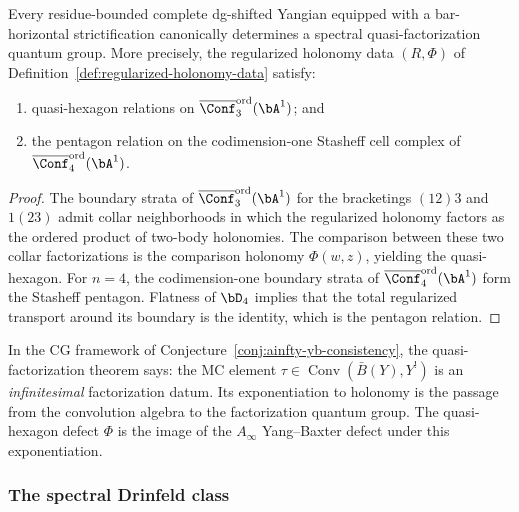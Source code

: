 \begin{theorem}
\label{thm:spectral-quasi-factorization}
Every residue-bounded complete dg-shifted Yangian equipped
with a bar-horizontal strictification canonically determines a
spectral quasi-factorization quantum group. More precisely,
the regularized holonomy data $(R,\Phi)$ of
Definition~\textup{\ref{def:regularized-holonomy-data}} satisfy:
\begin{enumerate}[label=\textup{(\roman*)}]
\item quasi-hexagon relations on
 $\overline{\Conf}_3^{\mathrm{ord}}(\bA^1)$; and
\item the pentagon relation on the codimension-one Stasheff
 cell complex of $\overline{\Conf}_4^{\mathrm{ord}}(\bA^1)$.
\end{enumerate}
\end{theorem}

\begin{proof}
The boundary strata of
$\overline{\Conf}_3^{\mathrm{ord}}(\bA^1)$ for the
bracketings $(12)3$ and $1(23)$ admit collar neighborhoods
in which the regularized holonomy factors as the ordered
product of two-body holonomies. The comparison between
these two collar factorizations is the comparison holonomy
$\Phi(w,z)$, yielding the quasi-hexagon.
For $n = 4$, the codimension-one boundary strata of
$\overline{\Conf}_4^{\mathrm{ord}}(\bA^1)$ form the
Stasheff pentagon. Flatness of $\bD_4$ implies that the
total regularized transport around its boundary is the
identity, which is the pentagon relation.
\end{proof}

\begin{remark}[CG interpretation]
\label{rem:spectral-bridge-cg}
In the CG framework of
Conjecture~\ref{conj:ainfty-yb-consistency}, the
quasi-factorization theorem says: the MC element
$\tau \in \operatorname{Conv}(\bar B(Y), Y^!)$ is an
\emph{infinitesimal} factorization datum. Its
exponentiation to holonomy is the passage from the
convolution algebra to the factorization quantum group.
The quasi-hexagon defect $\Phi$ is the image of the
$A_\infty$ Yang--Baxter defect under this exponentiation.
\end{remark}

\subsubsection{The spectral Drinfeld class}

